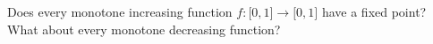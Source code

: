 Does every monotone increasing function \(f \colon  \mathbb[0,1] \to \mathbb[0,1]\) have a fixed point?
What about every monotone decreasing function?